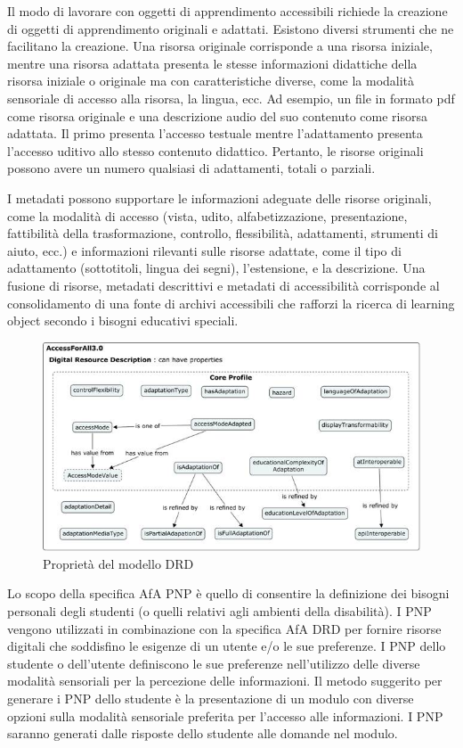 Il modo di lavorare con oggetti di apprendimento accessibili richiede la creazione di oggetti di apprendimento originali e adattati. Esistono diversi strumenti che ne facilitano la creazione. Una risorsa originale corrisponde a una risorsa iniziale, mentre una risorsa adattata presenta le stesse informazioni didattiche della risorsa iniziale o originale ma con caratteristiche diverse, come la modalità sensoriale di accesso alla risorsa, la lingua, ecc. Ad esempio, un file in formato pdf come risorsa originale e una descrizione audio del suo contenuto come risorsa adattata. Il primo presenta l'accesso testuale mentre l'adattamento presenta l'accesso uditivo allo stesso contenuto didattico. Pertanto, le risorse originali possono avere un numero qualsiasi di adattamenti, totali o parziali.

I metadati possono supportare le informazioni adeguate delle risorse originali, come la modalità di accesso (vista, udito, alfabetizzazione, presentazione, fattibilità della trasformazione, controllo, flessibilità, adattamenti, strumenti di aiuto, ecc.) e informazioni rilevanti sulle risorse adattate, come il tipo di adattamento (sottotitoli, lingua dei segni), l'estensione, e la descrizione. Una fusione di risorse, metadati descrittivi e metadati di accessibilità corrisponde al consolidamento di una fonte di archivi accessibili che rafforzi la ricerca di learning object secondo i bisogni educativi speciali.

\begin{figure}[H]
\centering
\includegraphics[scale=0.7]{res/drd.png}
\caption{Proprietà del modello DRD}
\label{fig:drd}
\end{figure}

Lo scopo della specifica AfA PNP è quello di consentire la definizione dei bisogni personali degli studenti (o quelli relativi agli ambienti della disabilità). I PNP vengono utilizzati in combinazione con la specifica AfA DRD per fornire risorse digitali che soddisfino le esigenze di un utente e/o le sue preferenze. I PNP dello studente o dell'utente definiscono le sue preferenze nell'utilizzo delle diverse modalità sensoriali per la percezione delle informazioni. Il metodo suggerito per generare i PNP dello studente è la presentazione di un modulo con diverse opzioni sulla modalità sensoriale preferita per l'accesso alle informazioni. I PNP saranno generati dalle risposte dello studente alle domande nel modulo.

